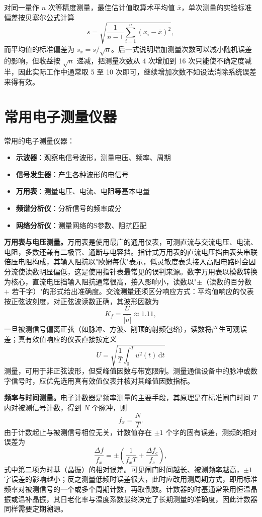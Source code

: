 对同一量作 $n$ 次等精度测量，最佳估计值取算术平均值 $\bar{x}$，单次测量的实验标准偏差按贝塞尔公式计算
\[
s = \sqrt{\frac{1}{n-1}\sum_{i=1}^{n}(x_i - \bar{x})^2},
\]
而平均值的标准偏差为 $s_{\bar{x}} = s/\sqrt{n}$。后一式说明增加测量次数可以减小随机误差的影响，但收益按 $\sqrt{n}$ 递减，把测量次数从 4 次增加到 16 次只能使不确定度减半，因此实际工作中通常取 5 至 10 次即可，继续增加次数不如设法消除系统误差来得有效。

\section{常用电子测量仪器}
\label{sec:common_instruments}

常用的电子测量仪器：

\begin{itemize}
    \item \textbf{示波器}：观察电信号波形，测量电压、频率、周期
    \item \textbf{信号发生器}：产生各种波形的电信号
    \item \textbf{万用表}：测量电压、电流、电阻等基本电量
    \item \textbf{频谱分析仪}：分析信号的频率成分
    \item \textbf{网络分析仪}：测量网络的S参数、阻抗匹配
\end{itemize}

\textbf{万用表与电压测量。}万用表是使用最广的通用仪表，可测直流与交流电压、电流、电阻，多数还兼有二极管、通断与电容挡。指针式万用表的直流电压挡由表头串联倍压电阻构成，其输入阻抗以"欧姆每伏"表示，低灵敏度表头接入高阻电路时会因分流使读数明显偏低，这是使用指针表最常见的误判来源。数字万用表以模数转换为核心，直流电压挡输入阻抗通常很高，接入影响小，读数以"$\pm$（读数的百分数 $+$ 若干字）"的形式给出准确度。交流测量还须区分响应方式：平均值响应的仪表按正弦波刻度，对正弦波读数正确，其波形因数为
\[
K_f = \frac{U}{\overline{|u|}} \approx 1.11,
\]
一旦被测信号偏离正弦（如脉冲、方波、削顶的射频包络），读数将产生可观误差；真有效值响应的仪表直接按定义
\[
U = \sqrt{\frac{1}{T}\int_{0}^{T} u^2(t)\,\mathrm{d}t}
\]
测量，可用于非正弦波形，但受峰值因数与带宽限制。测量通信设备中的脉冲或数字信号时，应优先选用真有效值仪表并核对其峰值因数指标。

\textbf{频率与时间测量。}电子计数器是频率测量的主要手段，其原理是在标准闸门时间 $T$ 内对被测信号计数，得到 $N$ 个脉冲，则
\[
f_x = \frac{N}{T}.
\]
由于计数起止与被测信号相位无关，计数值存在 $\pm 1$ 个字的固有误差，测频的相对误差为
\[
\frac{\Delta f}{f_x} = \pm\left(\frac{1}{f_x T} + \frac{\Delta f_c}{f_c}\right),
\]
式中第二项为时基（晶振）的相对误差。可见闸门时间越长、被测频率越高，$\pm 1$ 字误差的影响越小；反之测量低频时误差很大，此时应改用测周期方式，即用标准频率对被测信号的一个或多个周期计数，再取倒数。计数器的时基通常采用恒温晶振或温补晶振，其日老化率与温度系数最终决定了长期测量的准确度，因此计数器同样需要定期溯源。

